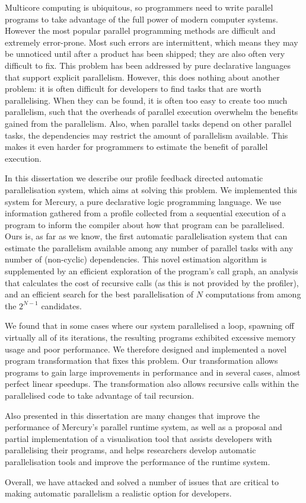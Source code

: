 
Multicore computing is ubiquitous,
so programmers need to write
parallel programs to take advantage of the full power of modern computer
systems.
However the most popular parallel programming methods are difficult and
extremely error-prone.
Most such errors are intermittent,
which means they may be unnoticed until after a product has been shipped;
they are also often very difficult to fix.
This problem has been addressed by pure declarative languages that support
explicit parallelism.
However, this does nothing about another problem:
it is often difficult for developers to find tasks that are worth
parallelising.
When they can be found,
it is often too easy to create too much parallelism,
such that the overheads of parallel execution overwhelm the benefits gained
from the parallelism.
Also, when parallel tasks depend on other parallel tasks,
the dependencies may restrict the amount of parallelism available.
This makes it even harder for programmers to estimate the benefit of
parallel execution.

In this dissertation we describe our 
profile feedback directed automatic parallelisation system,
which aims at solving this problem.
We implemented this system for Mercury, a pure declarative logic programming
language.
We use information gathered from a profile collected from a sequential
execution of a program to inform the compiler about how that program can be
parallelised.
Ours is, as far as we know, the first automatic parallelisation system that
can estimate the parallelism available among any number of parallel tasks
with any number of (non-cyclic) dependencies.
This novel estimation algorithm is supplemented by
an efficient exploration of the program's call graph,
an analysis that calculates the cost of recursive calls (as this is not provided
by the profiler),
and an efficient search for the best parallelisation of $N$ computations 
from among the $2^{N-1}$ candidates.

We found that in some cases where our system parallelised a loop,
spawning off virtually all of its iterations,
the resulting programs exhibited excessive memory usage and poor
performance.
We therefore designed and implemented
a novel program transformation that fixes this problem.
Our transformation allows programs to gain large improvements
in performance and in several cases, almost perfect linear speedups.
The transformation also allows recursive calls within the parallelised code
to take advantage of tail recursion.

Also presented in this dissertation are many changes that improve the
performance of Mercury's parallel runtime system,
as well as a proposal and partial implementation of a visualisation tool
that assists developers with parallelising their programs,
and helps researchers develop automatic parallelisation tools and
improve the performance of the runtime system.

Overall,
we have attacked and solved a number of issues that are critical to
making automatic parallelism a realistic option for developers.


